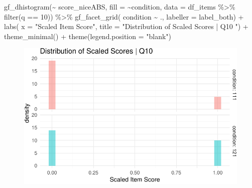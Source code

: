 \documentclass[
  letterpaper,
  DIV=11,
  numbers=noendperiod]{scrreprt}
\newenvironment{Shaded}{\begin{snugshade}}{\end{snugshade}}
\newcommand{\AttributeTok}[1]{\textcolor[rgb]{0.40,0.45,0.13}{#1}}
\newcommand{\DecValTok}[1]{\textcolor[rgb]{0.68,0.00,0.00}{#1}}
\newcommand{\FunctionTok}[1]{\textcolor[rgb]{0.28,0.35,0.67}{#1}}
\newcommand{\NormalTok}[1]{\textcolor[rgb]{0.00,0.23,0.31}{#1}}
\newcommand{\SpecialCharTok}[1]{\textcolor[rgb]{0.37,0.37,0.37}{#1}}
\newcommand{\StringTok}[1]{\textcolor[rgb]{0.13,0.47,0.30}{#1}}
\begin{document}
\begin{Shaded}
\begin{Highlighting}[]
\FunctionTok{gf\_dhistogram}\NormalTok{(}\SpecialCharTok{\textasciitilde{}}\NormalTok{ score\_niceABS, }\AttributeTok{fill =} \SpecialCharTok{\textasciitilde{}}\NormalTok{condition, }\AttributeTok{data =}\NormalTok{ df\_items }\SpecialCharTok{\%\textgreater{}\%} \FunctionTok{filter}\NormalTok{(q }\SpecialCharTok{==} \DecValTok{10}\NormalTok{)) }\SpecialCharTok{\%\textgreater{}\%} 
  \FunctionTok{gf\_facet\_grid}\NormalTok{( condition }\SpecialCharTok{\textasciitilde{}}\NormalTok{ ., }\AttributeTok{labeller =}\NormalTok{ label\_both) }\SpecialCharTok{+} 
  \FunctionTok{labs}\NormalTok{( }\AttributeTok{x =} \StringTok{"Scaled Item Score"}\NormalTok{, }\AttributeTok{title =} \StringTok{"Distribution of Scaled Scores | Q10 "}\NormalTok{) }\SpecialCharTok{+} 
  \FunctionTok{theme\_minimal}\NormalTok{() }\SpecialCharTok{+} \FunctionTok{theme}\NormalTok{(}\AttributeTok{legend.position =} \StringTok{"blank"}\NormalTok{)}
\end{Highlighting}
\end{Shaded}

\begin{figure}[H]

{\centering \includegraphics{analysis/SGC3A/2_sgc3A_scoring_files/figure-pdf/Q10-distribution-1.pdf}

}

\end{figure}
\end{document}
